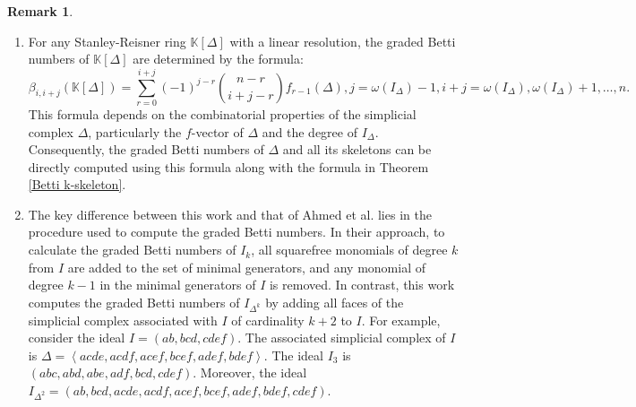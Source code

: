 \documentclass[a4paper,12pt]{amsart}
\numberwithin{equation}{section}
\theoremstyle{definition}
\newtheorem{remark}[theorem]{Remark}
\newcommand{\lr}[1]{\left\langle#1\right\rangle}
\newcommand{\K}[0]{\mathbb{K}}
\begin{document}
\begin{remark}
	\begin{enumerate}
		\item For any Stanley-Reisner ring $\K[\Delta]$ with a linear resolution, the graded Betti numbers of $\K[\Delta]$ are determined by the formula:
	$$\beta_{i,i+j}(\K[\Delta])=\sum_{r=0}^{i+j}(-1)^{j-r}\binom{n-r}{i+j-r}f_{r-1}(\Delta), j=\omega(I_{\Delta})-1, i+j=\omega(I_{\Delta}),\omega(I_{\Delta})+1,\dots,n.$$
	This formula depends on the combinatorial properties of the simplicial complex $\Delta$, particularly the $f$-vector of $\Delta$ and the degree of $I_{\Delta}$. Consequently, the graded Betti numbers of $\Delta$ and all its skeletons can be directly computed using this formula along with the formula in Theorem \ref{Betti k-skeleton}.
	
	\item The key difference between this work and that of Ahmed et al. \cite{AhmedFrobergNamiq2023} lies in the procedure used to compute the graded Betti numbers. In their approach, to calculate the graded Betti numbers of $I_k$, all squarefree monomials of degree $k$ from $I$ are added to the set of minimal generators, and any monomial of degree $k-1$ in the minimal generators of $I$ is removed. In contrast, this work computes the graded Betti numbers of $I_{\Delta^k}$ by adding all faces of the simplicial complex associated with $I$ of cardinality $k+2$ to $I$. For example, consider the ideal $I=(ab,bcd,cdef)$. The associated simplicial complex of $I$ is $\Delta=\lr{acde,acdf,acef,bcef,adef,bdef}$. The ideal $I_3$ is $(abc,abd,abe,adf,bcd,cdef)$. Moreover, the ideal $I_{\Delta^{2}}=(ab,bcd,acde, acdf,acef,bcef,adef,bdef,cdef)$.
	\end{enumerate}
\end{remark}
\end{document}
